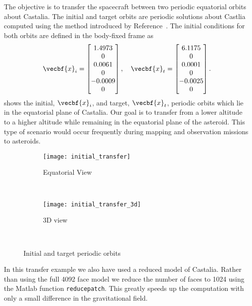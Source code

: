 The objective is to transfer the spacecraft between two periodic equatorial orbits about Castalia.
The initial and target orbits are periodic solutions about Castlia computed using the method introduced by Reference~\cite{scheeres2003}.
The initial conditions for both orbits are defined in the body-fixed frame as
\begin{align}\label{sec:initial_transfer}
    \vecbf{x}_i = 
    \begin{bmatrix}
        1.4973 \\ 0 \\ 0.0061 \\ 0\\ -0.0009 \\ 0
    \end{bmatrix} ,
    \quad
    \vecbf{x}_t =
    \begin{bmatrix}
        6.1175 \\ 0 \\ 0.0001 \\ 0\\ -0.0025 \\ 0
    \end{bmatrix} .
\end{align}
 shows the initial, \( \vecbf{x}_i \), and target, \( \vecbf{x}_t\), periodic orbits which lie in the equatorial plane of Castalia.
Our goal is to transfer from a lower altitude to a higher altitude while remaining in the equatorial plane of the asteroid.
This type of scenario would occur frequently during mapping and observation missions to asteroids.
\begin{figure}[htbp]
    \centering 
    \begin{subfigure}[htbp]{0.45\textwidth} 
        \texttt{[image: initial\_transfer]} 
        \caption{Equatorial View} \label{fig:eq_initial_transfer} 
    \end{subfigure}~ %
    \begin{subfigure}[htbp]{0.45\textwidth} 
        \texttt{[image: initial\_transfer\_3d]} 
        \caption{3D view} \label{fig:initial_transfer_3d} 
    \end{subfigure} ~ %
    \caption{Initial and target periodic orbits}
    \label{fig:initial_transfer} 
\end{figure}
In this transfer example we also have used a reduced model of Castalia.
Rather than using the full \num{4092} face model we reduce the number of faces to \num{1024} using the Matlab function \verb+reducepatch+. 
This greatly speeds up the computation with only a small difference in the gravitational field.

